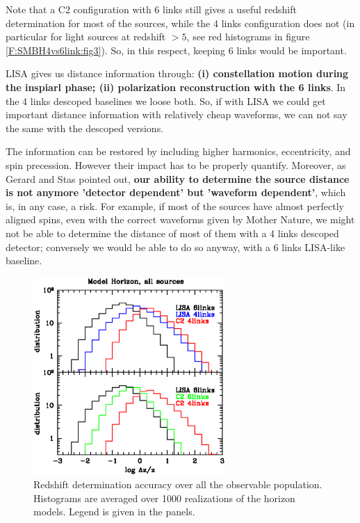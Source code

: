 \documentclass{iopart}
\begin{document}
Note that a C2 configuration with 6 links still gives a useful redshift determination for most of the sources, while the 4 links configuration does not (in particular for light sources at redshift $>5$, see red histograms in figure \ref{F:SMBH4vs6link:fig3}). So, in this respect, keeping 6 links would be important. 

LISA gives us distance information through: {\bf (i) constellation motion during the inspiarl phase; (ii) polarization reconstruction with the 6 links}. In the 4 links descoped baselines we loose both. So, if with LISA we could get important distance information with relatively cheap waveforms, we can not say the same with the descoped versions.

The information can be restored by including higher harmonics, eccentricity, and spin precession. However their impact has to be properly quantify. Moreover, as Gerard and Stas pointed out, {\bf our ability to determine the source distance is not anymore 'detector dependent' but 'waveform dependent'}, which is, in any case, a risk. For example, if most of the sources have almost perfectly aligned spins, even with the correct waveforms given by Mother Nature, we might not be able to determine the distance of most of them with a 4 links descoped detector; conversely we would be able to do so anyway, with a 6 links LISA-like baseline.

 
\begin{figure}[H]
\center
   \includegraphics[width=0.65\textwidth]{FigSMBHModSel/FIG_comparison_all.eps}
\caption{Redshift determination accuracy over all the observable population.
Histograms are averaged over 1000 realizations of the horizon models. Legend 
is given in the panels.
\label{F:SMBH4vs6link:fig1} } 
\end{figure}
\end{document}

